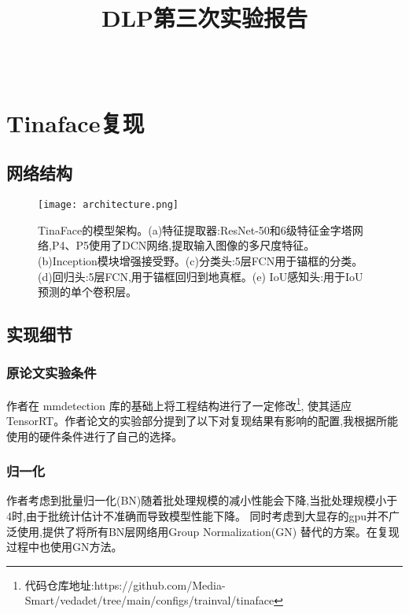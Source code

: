 \documentclass[10pt,a4paper]{article}%
\title{\fontsize{18pt}{27pt}\selectfont%
	{\heiti%
	DLP第三次实验报告\\{\rightline{——TinaFace\cite{DBLP:journals/corr/abs-2011-13183}复现及改进}}
	}}%
\author{\fontsize{12pt}{18pt}\selectfont%
	{\fangsong%
	\rightline{韩广意PB20030835}
	}\\%
	\fontsize{10.5pt}{15.75pt}\selectfont%
}
\date{}
\begin{document}
	\maketitle%
	\lhead{}%
	\chead{}%
	\rhead{}%
	\lfoot{}%
	\cfoot{\thepage}%
	\rfoot{}%
	 
	\section{Tinaface复现}
	\subsection{网络结构}
	\begin{figure*}[h]%
		\centering
		\begin{minipage}{1\textwidth}%
			\centering
			\texttt{[image: architecture.png]}%
			\caption{\fontsize{10pt}{15pt}\selectfont 
			TinaFace的模型架构。(a)特征提取器:ResNet-50和6级特征金字塔网络,P4、P5使用了DCN网络,提取输入图像的多尺度特征。(b)Inception模块增强接受野。(c)分类头:5层FCN用于锚框的分类。
			(d)回归头:5层FCN,用于锚框回归到地真框。(e) IoU感知头:用于IoU预测的单个卷积层。
		}%
		\end{minipage}
	\end{figure*}	

	\subsection{实现细节}
	\subsubsection{原论文实验条件}
	作者在 mmdetection 库的基础上将工程结构进行了一定修改\footnote{代码仓库地址:https://github.com/Media-Smart/vedadet/tree/main/configs/trainval/tinaface},
	使其适应TensorRT。作者论文的实验部分提到了以下对复现结果有影响的配置,我根据所能使用的硬件条件进行了自己的选择。\\
	\subsubsection*{归一化}
	作者考虑到批量归一化(BN)随着批处理规模的减小性能会下降,当批处理规模小于4时,由于批统计估计不准确而导致模型性能下降。
	同时考虑到大显存的gpu并不广泛使用,提供了将所有BN层网络用Group Normalization(GN) 替代的方案。在复现过程中也使用GN方法。\\
\end{document}
